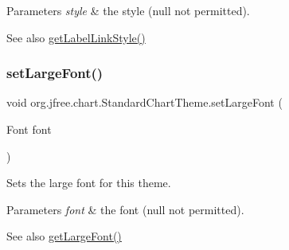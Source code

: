 \begin{DoxyParams}{Parameters}
{\em style} & the style ({\ttfamily null} not permitted).\\
\hline
\end{DoxyParams}
\begin{DoxySeeAlso}{See also}
\mbox{\hyperlink{classorg_1_1jfree_1_1chart_1_1_standard_chart_theme_ad9307f3123c0bb7f50910dce759ddcf4}{get\+Label\+Link\+Style()}} 
\end{DoxySeeAlso}
\mbox{\label{classorg_1_1jfree_1_1chart_1_1_standard_chart_theme_ab425d53672731d2bc1918d8916c299d7}} 
\subsubsection{\texorpdfstring{set\+Large\+Font()}{setLargeFont()}}
{\footnotesize\ttfamily void org.\+jfree.\+chart.\+Standard\+Chart\+Theme.\+set\+Large\+Font (\begin{DoxyParamCaption}\item[{Font}]{font }\end{DoxyParamCaption})}

Sets the large font for this theme.


\begin{DoxyParams}{Parameters}
{\em font} & the font ({\ttfamily null} not permitted).\\
\hline
\end{DoxyParams}
\begin{DoxySeeAlso}{See also}
\mbox{\hyperlink{classorg_1_1jfree_1_1chart_1_1_standard_chart_theme_a55c6caf1eb9cfc15990f39b9bf69573d}{get\+Large\+Font()}} 
\end{DoxySeeAlso}
\mbox{\label{classorg_1_1jfree_1_1chart_1_1_standard_chart_theme_ada53066c7505682778d0bc8ed4fdab66}} 
